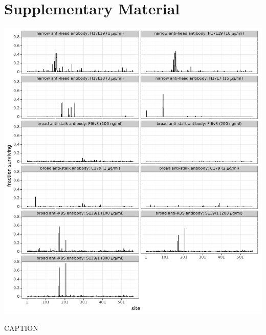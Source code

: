 \documentclass[11pt]{article}
\begin{document}



\clearpage
\normalsize

\section*{Supplementary Material}
\FloatBarrier

\begin{suppfigure}
\centerline{\includegraphics[width=\textwidth]{figs/maxfracsurvive.pdf}}
\caption{\label{suppfig:maxfracsurvive}
CAPTION}
\end{suppfigure}
\end{document}
